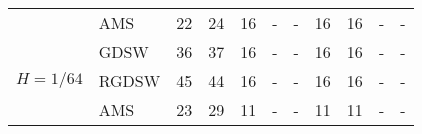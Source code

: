 \begin{table}[H]
\begin{tabular}{llrrrllrrll}
\cline{2-11}
\bfseries  & AMS & 22 & {\cellcolor[HTML]{405FE5}} \color[HTML]{F1F1F1} 24 & 16 & {\cellcolor[HTML]{ACB8F4}} \color[HTML]{000000} {\cellcolor[HTML]{E2E4FB}} - & - & {\cellcolor[HTML]{768BEC}} \color[HTML]{F1F1F1} 16 & 16 & {\cellcolor[HTML]{E2E4FB}} \color[HTML]{000000} {\cellcolor[HTML]{E2E4FB}} - & - \\
\cline{1-11} \cline{2-11}
\multirow[c]{3}{*}{\bfseries $H=1/64$} & GDSW & 36 & {\cellcolor[HTML]{405FE5}} \color[HTML]{F1F1F1} 37 & 16 & {\cellcolor[HTML]{ACB8F4}} \color[HTML]{000000} {\cellcolor[HTML]{E2E4FB}} - & - & {\cellcolor[HTML]{768BEC}} \color[HTML]{F1F1F1} 16 & 16 & {\cellcolor[HTML]{E2E4FB}} \color[HTML]{000000} {\cellcolor[HTML]{E2E4FB}} - & - \\
\cline{2-11}
\bfseries  & RGDSW & 45 & {\cellcolor[HTML]{405FE5}} \color[HTML]{F1F1F1} 44 & 16 & {\cellcolor[HTML]{ACB8F4}} \color[HTML]{000000} {\cellcolor[HTML]{E2E4FB}} - & - & {\cellcolor[HTML]{768BEC}} \color[HTML]{F1F1F1} 16 & 16 & {\cellcolor[HTML]{E2E4FB}} \color[HTML]{000000} {\cellcolor[HTML]{E2E4FB}} - & - \\
\cline{2-11}
\bfseries  & AMS & 23 & {\cellcolor[HTML]{405FE5}} \color[HTML]{F1F1F1} 29 & 11 & {\cellcolor[HTML]{ACB8F4}} \color[HTML]{000000} {\cellcolor[HTML]{E2E4FB}} - & - & {\cellcolor[HTML]{768BEC}} \color[HTML]{F1F1F1} 11 & 11 & {\cellcolor[HTML]{E2E4FB}} \color[HTML]{000000} {\cellcolor[HTML]{E2E4FB}} - & - \\
\cline{1-11} \cline{2-11}
\bottomrule
\end{tabular}
\end{table}
